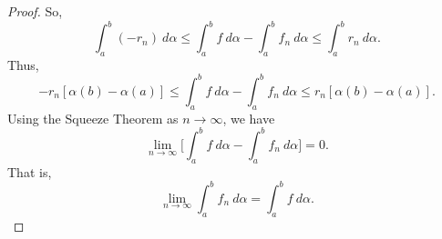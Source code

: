 \begin{proof}
    So, 
    \[  \int_{ a }^{ b } (-{r}_{n})  \ d \alpha \leq \int_{ a }^{ b }  f  \ d \alpha - \int_{ a }^{ b }  {f}_{n} \ d \alpha \leq \int_{ a }^{ b }  {r}_{n} \ d \alpha. \]
    Thus, 
    \[  - {r}_{n} [\alpha(b) - \alpha(a)] \leq \int_{ a }^{ b }  f  \ d \alpha - \int_{ a }^{ b }  {f}_{n}  \ d \alpha \leq {r}_{n} [\alpha(b) - \alpha(a)]. \]
    Using the Squeeze Theorem as \( n \to \infty   \), we have
    \[  \lim_{ n \to \infty  }  \Big[ \int_{ a }^{ b }  f  \ d \alpha - \int_{ a }^{ b }  {f}_{n} \ d \alpha \Big] = 0.  \]
    That is, 
    \[ \lim_{ n \to \infty   } \int_{ a }^{ b }  {f}_{n} \ d \alpha = \int_{ a }^{ b }  f  \ d \alpha. \]
    \[   \]
\end{proof}



